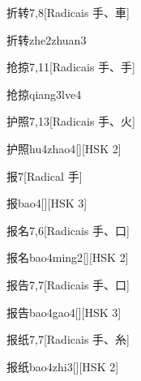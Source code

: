 \begin{entry}{折转}{7,8}[Radicais ⼿、⾞]
  \begin{phonetics}{折转}{zhe2zhuan3}
  \end{phonetics}
\end{entry}

\begin{entry}{抢掠}{7,11}[Radicais ⼿、⼿]
  \begin{phonetics}{抢掠}{qiang3lve4}
  \end{phonetics}
\end{entry}

\begin{entry}{护照}{7,13}[Radicais ⼿、⽕]
  \begin{phonetics}{护照}{hu4zhao4}[][HSK 2]
  \end{phonetics}
\end{entry}

\begin{entry}{报}{7}[Radical ⼿]
  \begin{phonetics}{报}{bao4}[][HSK 3]
  \end{phonetics}
\end{entry}

\begin{entry}{报名}{7,6}[Radicais ⼿、⼝]
  \begin{phonetics}{报名}{bao4ming2}[][HSK 2]
  \end{phonetics}
\end{entry}

\begin{entry}{报告}{7,7}[Radicais ⼿、⼝]
  \begin{phonetics}{报告}{bao4gao4}[][HSK 3]
  \end{phonetics}
\end{entry}

\begin{entry}{报纸}{7,7}[Radicais ⼿、⽷]
  \begin{phonetics}{报纸}{bao4zhi3}[][HSK 2]
  \end{phonetics}
\end{entry}


